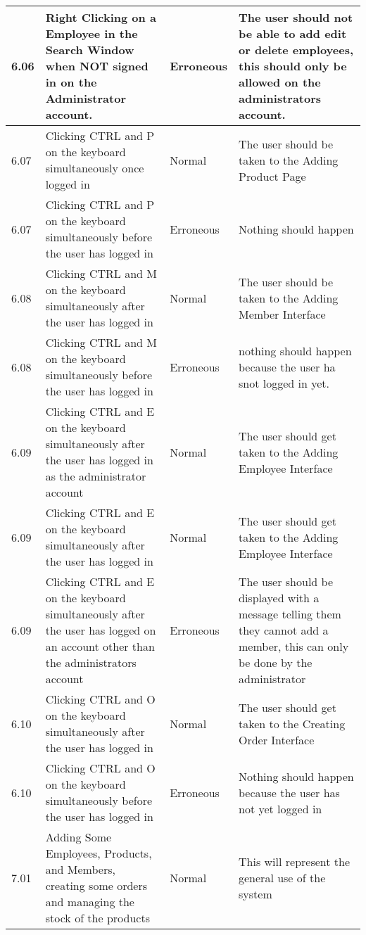 \begin{flushleft}
\begin{longtable}{|p{1.5cm}|p{2.5cm}|p{2cm}|p{4.5cm}|}
	\rowcolor{light-grey}6.06 & Right Clicking on a Employee in the Search Window when NOT signed in on the Administrator account. & Erroneous & The user should not be able to add edit or delete employees, this should only be allowed on the administrators account. \\ \hline
	\rowcolor{light-grey} 6.07 & Clicking CTRL and P on the keyboard simultaneously once logged in & Normal & The user should be taken to the Adding Product Page \\ \hline
	\rowcolor{light-grey} 6.07 & Clicking CTRL and P on the keyboard simultaneously before the user has logged in & Erroneous & Nothing should happen\\ \hline
	\rowcolor{light-grey} 6.08 & Clicking CTRL and M on the keyboard simultaneously after the user has logged in & Normal & The user should be taken to the Adding Member Interface \\ \hline
	\rowcolor{light-grey} 6.08 & Clicking CTRL and M on the keyboard simultaneously before the user has logged in & Erroneous & nothing should happen because the user ha snot logged in yet. \\ \hline
	\rowcolor{light-grey} 6.09 & Clicking CTRL and E on the keyboard simultaneously after the user has logged in as the administrator account & Normal & The user should get taken to the Adding Employee Interface \\ \hline
	\rowcolor{light-grey} 6.09 & Clicking CTRL and E on the keyboard simultaneously after the user has logged in & Normal & The user should get taken to the Adding Employee Interface \\ \hline
	\rowcolor{light-grey} 6.09 & Clicking CTRL and E on the keyboard simultaneously after the user has logged on an account other than the administrators account & Erroneous & The user should be displayed with a message telling them they cannot add a member, this can only be done by the administrator \\ \hline
	\rowcolor{light-grey} 6.10 & Clicking CTRL and O on the keyboard simultaneously after the user has logged in & Normal & The user should get taken to the Creating Order Interface \\ \hline
	\rowcolor{light-grey} 6.10 & Clicking CTRL and O on the keyboard simultaneously before the user has logged in & Erroneous & Nothing should happen because the user has not yet logged in \\ \hline
	\rowcolor{light-grey} 7.01 & Adding Some Employees, Products, and Members, creating some orders and managing the stock of the products & Normal & This will represent the general use of the system \\ \hline
    \end{longtable}
\end{flushleft}



